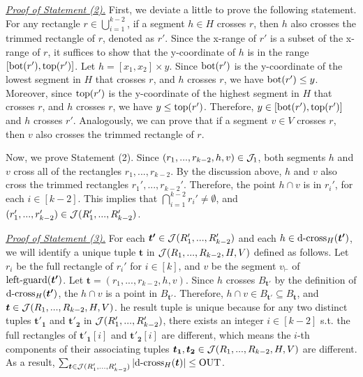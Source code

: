 

\noindent \underline{\em Proof of Statement (2).} 
First, we deviate a little to prove the following statement. For any rectangle $r\in \bigcup_{i = 1}^{k-2}$, if a segment $h\in H$ crosses $r$, then $h$ also crosses the trimmed rectangle of $r$, denoted as $r'$. Since the x-range of $r'$ is a subset of the x-range of $r$, it suffices to show that the y-coordinate of $h$ is in the range $[\mathrm{bot}(r'), \mathrm{top}(r')]$. Let $h = [x_1,x_2]\times y$. Since $\mathrm{bot}(r')$ is the y-coordinate of the lowest segment in $H$ that crosses $r$, and $h$ crosses $r$, we have $\mathrm{bot}(r') \leq y$. Moreover, since $\mathrm{top}(r')$ is the y-coordinate of the highest segment in $H$ that crosses $r$, and $h$ crosses $r$, we have $y \leq \mathrm{top}(r')$. Therefore, $y \in [\mathrm{bot}(r'), \mathrm{top}(r')]$ and $h$ crosses $r'$.  Analogously, we can prove that if a segment $v\in V$ crosses $r$, then $v$ also crosses the trimmed rectangle of $r$.

\vgap

Now, we prove Statement (2). Since $(r_1,...,r_{k-2},h,v)\in \mathcal{J}_1$, both segments $h$ and $v$ cross all of the rectangles $r_1,..., r_{k-2}$. By the discussion above, $h$ and $v$ also cross the trimmed rectangles $r_1',..., r_{k-2}'$. Therefore, the point $h \cap v$ is in $r_i'$, for each $i \in [k-2]$. This implies that $\bigcap_{i = 1}^{k-2}r_i' \neq \emptyset$, and $(r_1',..., r_{k-2}')\in \mathcal{J}(R_1',...,R_{k-2}')$.
 

\vgap

\noindent \underline{\em Proof of Statement (3).}
For each $\textrm{\boldmath${t'}$}\in  \mathcal{J}(R_1',...,R_{k-2}')$ and each $h \in \mathrm{d\text{-}cross}_H(\textrm{\boldmath${t'}$})$, we will identify a unique tuple $\bm{t}$ in $\mathcal{J}(R_1,...,R_{k-2},H,V)$ defined as follows. Let $r_i$ be the full rectangle of $r_i'$ for $i \in [k]$, and $v$ be the segment $v_\vdash$ of $\mathrm{left\text{-}guard}(\textrm{\boldmath${t'}$})$. Let $\bm{t} = (r_1,...,r_{k-2},h,v)$. Since $h$ crosses $B_{\bm{t'}}$ by the definition of $\mathrm{d\text{-}cross}_H(\textrm{\boldmath${t'}$})$, the $h\cap v$ is a point in $B_{\bm{t'}}$.
Therefore, $h\cap v \in B_{\bm{t'}} \subseteq B_{\bm{t}}$, and $\textrm{\boldmath${t}$}\in \mathcal{J}(R_1,...,R_{k-2},H,V)$. he result tuple is unique because for any two distinct tuples $\bm{t'_1}$ and $\bm{t'_2}$ in $\mathcal{J}(R_1',...,R_{k-2}')$, there exists an integer $i \in [k-2]$ s.t. the full rectangles of $\bm{t'_1}[i]$ and $\bm{t'_2}[i]$ are different, which means the $i$-th components of their associating tuples $\textrm{\boldmath${t_1}$}, \textrm{\boldmath${t_2}$} \in \mathcal{J}(R_1,...,R_{k-2},H,V)$ are different. As a result, $\sum_{\textrm{\boldmath${t}$}\in \mathcal{J}(R_1',...,R_{k-2}')}  |\mathrm{d\text{-}cross}_H(\textrm{\boldmath${t}$})| \leq \mathrm{OUT}$.

